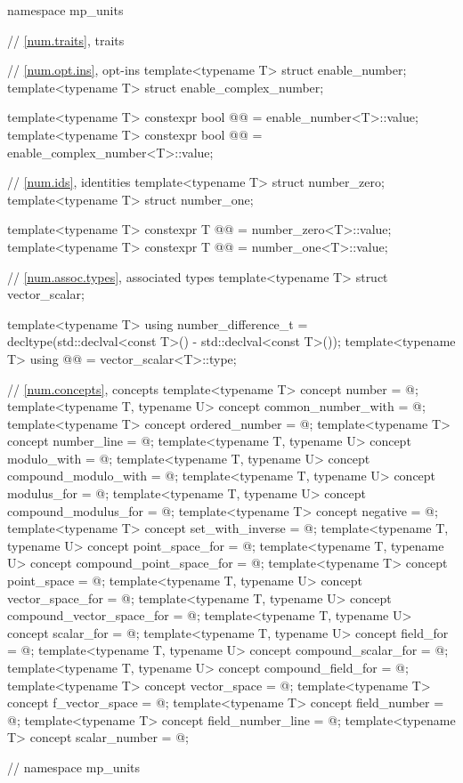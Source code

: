 \begin{codeblock}
namespace mp_units {

// \ref{num.traits}, traits

// \ref{num.opt.ins},  opt-ins
template<typename T>
struct enable_number;
template<typename T>
struct enable_complex_number;

template<typename T>
constexpr bool @@ = enable_number<T>::value;
template<typename T>
constexpr bool @@ = enable_complex_number<T>::value;

// \ref{num.ids}, identities
template<typename T>
struct number_zero;
template<typename T>
struct number_one;

template<typename T>
constexpr T @@ = number_zero<T>::value;
template<typename T>
constexpr T @@ = number_one<T>::value;

// \ref{num.assoc.types}, associated types
template<typename T>
struct vector_scalar;

template<typename T>
using number_difference_t = decltype(std::declval<const T>() - std::declval<const T>());
template<typename T>
using @@ = vector_scalar<T>::type;

// \ref{num.concepts}, concepts
template<typename T>
concept number = @\seebelow@;
template<typename T, typename U>
concept common_number_with = @\seebelow@;
template<typename T>
concept ordered_number = @\seebelow@;
template<typename T>
concept number_line = @\seebelow@;
template<typename T, typename U>
concept modulo_with = @\seebelow@;
template<typename T, typename U>
concept compound_modulo_with = @\seebelow@;
template<typename T, typename U>
concept modulus_for = @\seebelow@;
template<typename T, typename U>
concept compound_modulus_for = @\seebelow@;
template<typename T>
concept negative = @\seebelow@;
template<typename T>
concept set_with_inverse = @\seebelow@;
template<typename T, typename U>
concept point_space_for = @\seebelow@;
template<typename T, typename U>
concept compound_point_space_for = @\seebelow@;
template<typename T>
concept point_space = @\seebelow@;
template<typename T, typename U>
concept vector_space_for = @\seebelow@;
template<typename T, typename U>
concept compound_vector_space_for = @\seebelow@;
template<typename T, typename U>
concept scalar_for = @\seebelow@;
template<typename T, typename U>
concept field_for = @\seebelow@;
template<typename T, typename U>
concept compound_scalar_for = @\seebelow@;
template<typename T, typename U>
concept compound_field_for = @\seebelow@;
template<typename T>
concept vector_space = @\seebelow@;
template<typename T>
concept f_vector_space = @\seebelow@;
template<typename T>
concept field_number = @\seebelow@;
template<typename T>
concept field_number_line = @\seebelow@;
template<typename T>
concept scalar_number = @\seebelow@;

}  // namespace mp_units
\end{codeblock}

